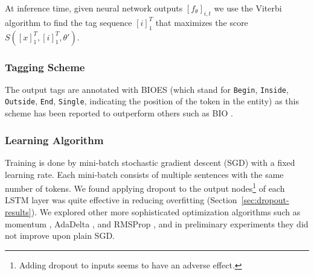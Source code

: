 \documentclass[11pt,letterpaper]{article}
\begin{document}
At inference time, given neural network outputs $[f_{\theta}]_{i,t}$ we use the Viterbi algorithm to find the tag sequence $[i]_1^T$ that maximizes the score $S([x]_1^T, [i]_1^T, \theta')$. 

\subsubsection{Tagging Scheme}

The output tags are annotated with BIOES (which stand for {\tt Begin}, 
{\tt Inside}, {\tt Outside}, {\tt End}, {\tt Single}, indicating the position of the token in the entity) as this scheme has been reported to outperform others such as BIO \cite{ratinov2009}.

\subsubsection{Learning Algorithm}

Training is done by mini-batch stochastic gradient descent (SGD) with a fixed learning rate. Each mini-batch consists of multiple sentences with the same number of tokens. 
We found applying dropout to the output nodes\footnote{Adding dropout to inputs seems to have an adverse effect.} of each LSTM layer \cite{pham2014} was quite effective in reducing overfitting (Section~\ref{sec:dropout-results}).
We explored other more sophisticated optimization algorithms such as momentum \cite{nesterov1983}, AdaDelta \cite{zeiler2012}, and RMSProp \cite{hinton2012}, and in preliminary experiments they did not improve upon plain SGD. 
\end{document}
